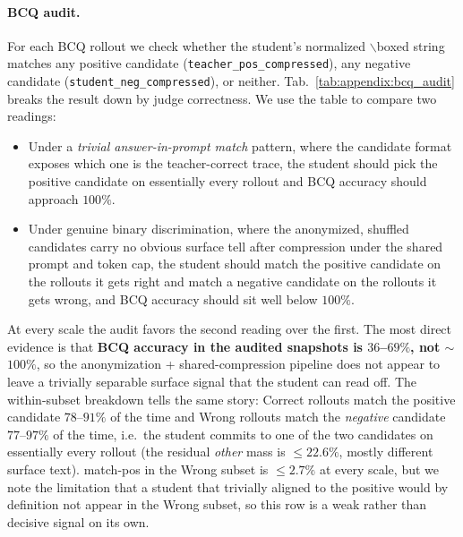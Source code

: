 \paragraph{BCQ audit.}
For each BCQ rollout we check whether the student's normalized $\backslash$boxed string matches any positive candidate (\texttt{teacher\_pos\_compressed}), any negative candidate (\texttt{student\_neg\_compressed}), or neither. Tab.~\ref{tab:appendix:bcq_audit} breaks the result down by judge correctness. We use the table to compare two readings:
\begin{itemize}[leftmargin=12pt,topsep=2pt,itemsep=2pt]
  \item Under a \emph{trivial answer-in-prompt match} pattern, where the candidate format exposes which one is the teacher-correct trace, the student should pick the positive candidate on essentially every rollout and BCQ accuracy should approach $100\%$.
  \item Under genuine binary discrimination, where the anonymized, shuffled candidates carry no obvious surface tell after compression under the shared prompt and token cap, the student should match the positive candidate on the rollouts it gets right and match a negative candidate on the rollouts it gets wrong, and BCQ accuracy should sit well below $100\%$.
\end{itemize}
At every scale the audit favors the second reading over the first. The most direct evidence is that \textbf{BCQ accuracy in the audited snapshots is $36$--$69\%$, not $\sim$$100\%$}, so the anonymization + shared-compression pipeline does not appear to leave a trivially separable surface signal that the student can read off. The within-subset breakdown tells the same story: Correct rollouts match the positive candidate $78$--$91\%$ of the time and Wrong rollouts match the \emph{negative} candidate $77$--$97\%$ of the time, i.e.\ the student commits to one of the two candidates on essentially every rollout (the residual \emph{other} mass is $\leq\!22.6\%$, mostly different surface text). match-pos in the Wrong subset is $\leq\!2.7\%$ at every scale, but we note the limitation that a student that trivially aligned to the positive would by definition not appear in the Wrong subset, so this row is a weak rather than decisive signal on its own.

